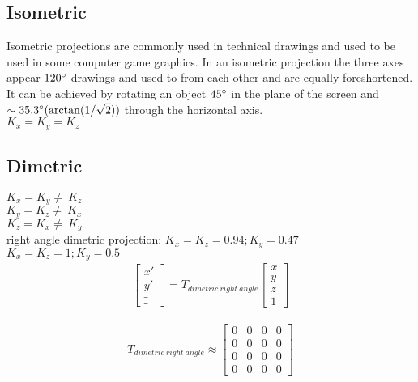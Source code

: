 \documentclass{article}
\begin{document}
\clearpage
\subsection{Isometric}
Isometric projections are commonly used in technical drawings and used to be used in some computer game graphics.
In an isometric projection the three axes appear $120\degree$ drawings and used to from each other and are equally foreshortened.
It can be achieved by rotating an object $45 \degree$ in the plane of the screen and $\sim 35.3 \degree (\arctan (1 / \sqrt 2))$ through the horizontal axis.
\\$K_x = K_y = K_z$
\subsection{Dimetric}
$K_x = K_y \neq~K_z$
\\$K_y = K_z \neq~K_x$
\\$K_z = K_x \neq~K_y$
\\right angle dimetric projection: $K_x = K_z = 0.94; K_y = 0.47$
\\$K_x = K_z = 1; K_y = 0.5$
\\
\begin{gather}
	\begin{bmatrix}
		x'\\
		y'\\
		\_\\
		\_
	\end{bmatrix}
	= T_{dimetric~right~angle}
	\begin{bmatrix}
		x\\
		y\\
		z\\
		1
	\end{bmatrix}
\end{gather}

\begin{gather}
	T_{dimetric~right~angle}
	\approx 
	\begin{bmatrix}
		0 & 0 & 0 & 0\\
		0 & 0 & 0 & 0\\
		0 & 0 & 0 & 0\\
		0 & 0 & 0 & 0
	\end{bmatrix}
\end{gather}
\end{document}
